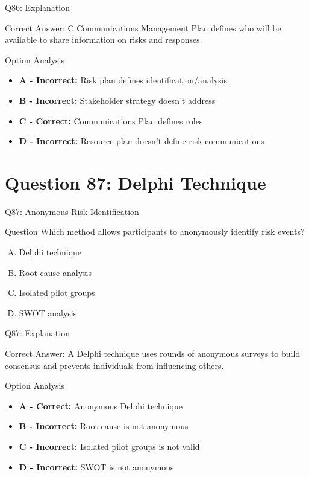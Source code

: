 \documentclass{beamer}
\begin{document}
	\begin{frame}{Q86: Explanation}
		\begin{block}{Correct Answer: C}
			Communications Management Plan defines who will be available to share information on risks and responses.
		\end{block}
		\begin{block}{Option Analysis}
			\begin{itemize}
				\item \textbf{A - Incorrect:} Risk plan defines identification/analysis
				\item \textbf{B - Incorrect:} Stakeholder strategy doesn't address
				\item \textbf{C - Correct:} Communications Plan defines roles
				\item \textbf{D - Incorrect:} Resource plan doesn't define risk communications
			\end{itemize}
		\end{block}
	\end{frame}
	
	\section{Question 87: Delphi Technique}
	
	\begin{frame}{Q87: Anonymous Risk Identification}
		\begin{block}{Question}
			Which method allows participants to anonymously identify risk events?
		\end{block}
		\begin{enumerate}[(A)]
			\item Delphi technique
			\item Root cause analysis
			\item Isolated pilot groups
			\item SWOT analysis
		\end{enumerate}
	\end{frame}
	
	\begin{frame}{Q87: Explanation}
		\begin{block}{Correct Answer: A}
			Delphi technique uses rounds of anonymous surveys to build consensus and prevents individuals from influencing others.
		\end{block}
		\begin{block}{Option Analysis}
			\begin{itemize}
				\item \textbf{A - Correct:} Anonymous Delphi technique
				\item \textbf{B - Incorrect:} Root cause is not anonymous
				\item \textbf{C - Incorrect:} Isolated pilot groups is not valid
				\item \textbf{D - Incorrect:} SWOT is not anonymous
			\end{itemize}
		\end{block}
	\end{frame}
	
\end{document}
